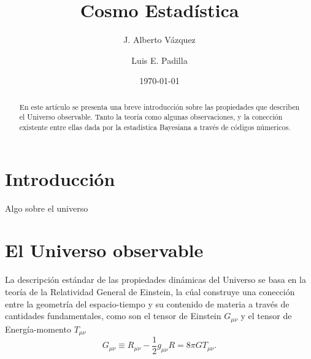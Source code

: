 \documentclass[10.5pt,prb,
               showpacs,            %
               preprintnumbers,     %
               aps,                 %
               prl,          	    %
               letterpaper,             %
               superscriptaddress,      %
               nofootinbib,         %
               tightenlines,        %
               floats,floatfix      %
               ,usenatbib]{revtex4-1}%
\def\beq{\begin{equation}}
\def\eeq{\end{equation}}
\begin{document}
\title{Cosmo Estad\'istica} 

\author{J. Alberto V\'azquez}

\author{Luis E. Padilla}




\date{\today}

\begin{abstract}
 En este art\'iculo se presenta una breve introducci\'on sobre las propiedades
 que describen el Universo observable. Tanto la teor\'ia como algunas observaciones, y la conecci\'on existente entre
 ellas dada por la estad\'istica Bayesiana a trav\'es de c\'odigos n\'umericos. 
 \end{abstract}


\maketitle

\section{Introducci\'on}

Algo sobre el universo

\section{El Universo observable}


La descripci\'on est\'andar de las propiedades din\'amicas del Universo se basa en la teor\'ia 
de la Relatividad General de Einstein, la c\'ual construye una conecci\'on entre la geometr\'ia del 
espacio-tiempo y su contenido de materia a trav\'es de cantidades fundamentales, como son el 
tensor de Einstein $G_{\mu \nu}$ y el tensor de Energ\'ia-momento $T_{\mu \nu}$
%
	\beq  \label{eq:Ricci}
		G_{\mu \nu} \equiv R_{\mu \nu} - \frac{1}{2}g_{\mu \nu}R =  8\pi G T_{\mu \nu}.
	\eeq
 
\end{document}
